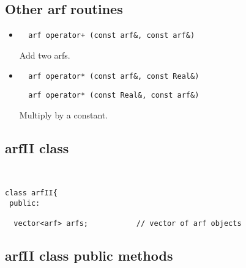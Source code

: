 \documentclass[11pt]{book}
\begin{document}
\subsection{Other arf routines}

\begin{itemize}

\item  \begin{verbatim}  arf operator+ (const arf&, const arf&) \end{verbatim}

          Add two arfs.

\item  \begin{verbatim}  arf operator* (const arf&, const Real&) \end{verbatim}
       \begin{verbatim}  arf operator* (const Real&, const arf&) \end{verbatim}

          Multiply by a constant.

\end{itemize}


\subsection{arfII class}

\begin{verbatim}


class arfII{
 public:

  vector<arf> arfs;           // vector of arf objects

\end{verbatim}

\subsection{arfII class public methods}
\end{document}
